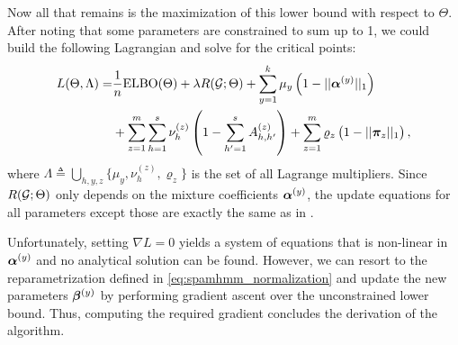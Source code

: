 Now all that remains is the maximization of this lower bound with respect to $\Theta$. After noting that some parameters are constrained to sum up to 1, we could build the following Lagrangian and solve for the critical points:
\begin{align}
	L(\Theta, \Lambda) = & \frac{1}{n} \mathrm{ELBO}(\Theta) + \lambda R({\mathcal{G}}; \Theta) + \sum_{y=1}^k \mu_y\left(1 - ||{\bm{\alpha}}^{(y)}||_{1}\right) \nonumber\\
	&+ \sum_{z=1}^m \sum_{h=1}^s \nu^{(z)}_h \left(1 - \sum_{h'=1}^s {A}^{(z)}_{h,h'}\right) 
	+ \sum_{z=1}^m \varrho_z \left(1 - ||{\bm{\pi}}_z||_{1}\right),
\end{align}
where $\Lambda \triangleq \bigcup_{h,y,z} \{\mu_y, \nu^{(z)}_h, \varrho_z\}$ is the set of all Lagrange multipliers. Since $R({\mathcal{G}}; \Theta)$ only depends on the mixture coefficients ${\bm{\alpha}}^{(y)}$, the update equations for all parameters except those are exactly the same as in . 

Unfortunately, setting $\nabla L = 0$ yields a system of equations that is non-linear in ${\bm{\alpha}}^{(y)}$ and no analytical solution can be found. However, we can resort to the reparametrization defined in \eqref{eq:spamhmm_normalization} and update the new parameters ${\bm{\beta}}^{(y)}$ by performing gradient ascent over the unconstrained lower bound. Thus, computing the required gradient concludes the derivation of the algorithm.

